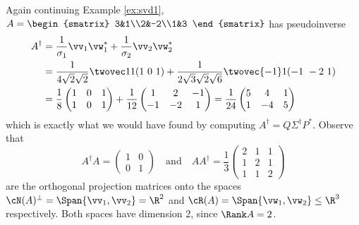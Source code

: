 \begin{examples}{}{}
\exstart Again continuing Example \ref{ex:svd1}, $A=\begin{smatrix}
  3&1\\2&-2\\1&3
\end{smatrix}$ has pseudoinverse
  \begin{align*}
  A^\dag&=\frac 1{\sigma_1}\vv_1\vw_1^*+\frac 1{\sigma_2}\vv_2\vw_2^*\\
  &=\frac 1{4\sqrt 2\sqrt 2}\twovec 11(1\ 0\ 1) +\frac 1{2\sqrt 3\sqrt 2\sqrt 6}\twovec{-1}1(-1\ -2\ 1)\\
  &=\frac 18\begin{pmatrix}
  1&0&1\\1&0&1
  \end{pmatrix}+\frac 1{12}\begin{pmatrix}
  1&2&-1\\-1&-2&1
  \end{pmatrix}
  =\frac 1{24}
  \begin{pmatrix}
  5&4&1\\1&-4&5
  \end{pmatrix}
  \end{align*}
  which is exactly what we would have found by computing $A^\dag=Q\Sigma^\dag P^*$. Observe that
  \[A^\dag A=
  \begin{pmatrix}
  1&0\\0&1
  \end{pmatrix}\quad\text{and}\quad
  AA^\dag=\frac 13
  \begin{pmatrix}
  2&1&1\\1&2&1\\1&1&2
  \end{pmatrix}\]
  are the orthogonal projection matrices onto the spaces $\cN(A)^\perp=\Span\{\vv_1,\vv_2\}=\R^2$ and $\cR(A)=\Span\{\vw_1,\vw_2\}\le\R^3$ respectively. Both spaces have dimension 2, since $\Rank A=2$.
	

\end{examples}
